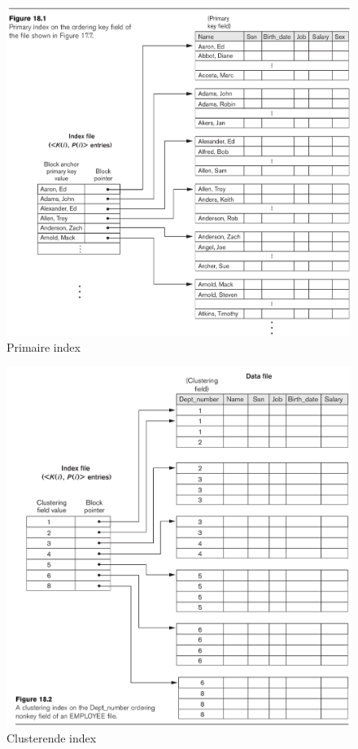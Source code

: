 \documentclass[indexstructuren.tex]{subfiles}
\begin{document}
\newpage
\begin{figure}[H]
\includegraphics[width=\linewidth]{illustraties/primaire_index.png}
\caption{Primaire index}
\end{figure}
\begin{figure}[H]
\includegraphics[width=\linewidth]{illustraties/clustering_index.png}
\caption{Clusterende index}
\end{figure}
\end{document}
